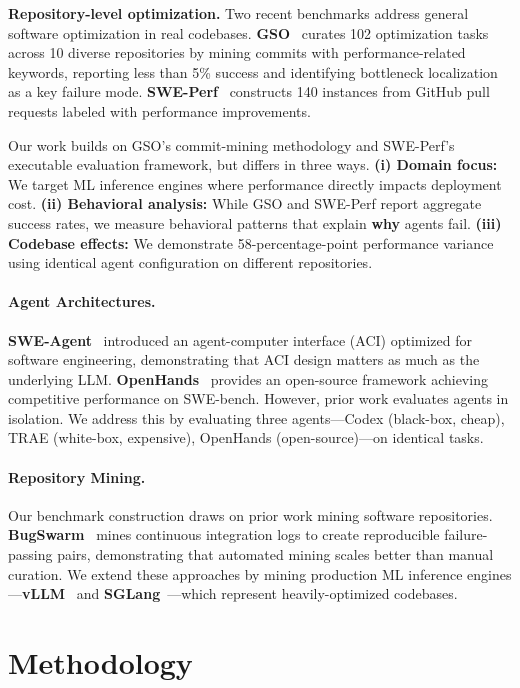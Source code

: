\documentclass{article}
\theoremstyle{plain}
\theoremstyle{definition}
\theoremstyle{remark}
\begin{document}
\textbf{Repository-level optimization.} Two recent benchmarks address general software optimization in real codebases. \textbf{GSO}~\citep{shetty2025gso} curates 102 optimization tasks across 10 diverse repositories by mining commits with performance-related keywords, reporting less than 5\% success and identifying bottleneck localization as a key failure mode. \textbf{SWE-Perf}~\citep{he2025sweperf} constructs 140 instances from GitHub pull requests labeled with performance improvements.

Our work builds on GSO's commit-mining methodology and SWE-Perf's executable evaluation framework, but differs in three ways. \textbf{(i) Domain focus:} We target ML inference engines where performance directly impacts deployment cost. \textbf{(ii) Behavioral analysis:} While GSO and SWE-Perf report aggregate success rates, we measure behavioral patterns that explain \textbf{why} agents fail. \textbf{(iii) Codebase effects:} We demonstrate 58-percentage-point performance variance using identical agent configuration on different repositories.

\paragraph{Agent Architectures.}
\textbf{SWE-Agent}~\citep{yang2024sweagent} introduced an agent-computer interface (ACI) optimized for software engineering, demonstrating that ACI design matters as much as the underlying LLM. \textbf{OpenHands}~\citep{wang2024openhands} provides an open-source framework achieving competitive performance on SWE-bench. However, prior work evaluates agents in isolation. We address this by evaluating three agents---Codex (black-box, cheap), TRAE (white-box, expensive), OpenHands (open-source)---on identical tasks.

\paragraph{Repository Mining.}
Our benchmark construction draws on prior work mining software repositories. \textbf{BugSwarm}~\citep{tomassi2019bugswarm} mines continuous integration logs to create reproducible failure-passing pairs, demonstrating that automated mining scales better than manual curation. We extend these approaches by mining production ML inference engines---\textbf{vLLM}~\citep{kwon2023vllm} and \textbf{SGLang}~\citep{zheng2023sglang}---which represent heavily-optimized codebases.

\section{Methodology}
\label{sec:methodology}
\end{document}
